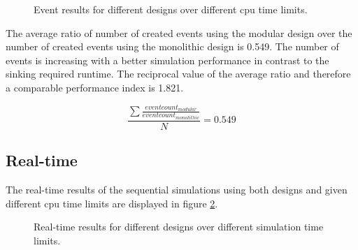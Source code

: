 \begin{figure}
    \centering
    \caption{Event results for different designs over different cpu time limits.}
    \label{fig:results_event_cpu_time}
\end{figure}

The average ratio of number of created events using the modular design over the number of created events using the monolithic design is 0.549.
The number of events is increasing with a better simulation performance in contrast to the sinking required runtime.
The reciprocal value of the average ratio and therefore a comparable performance index is 1.821.

\[\frac{\sum\frac{eventcount_{modular}}{eventcount_{monolithic}}}{N} = 0.549\]

\subsection{Real-time}
\label{sec:measurements_sequential_realtime}

The real-time results of the sequential simulations using both designs and given different cpu time limits are displayed in figure \ref{fig:results_realtime_sim_time}.

\begin{figure}
    \centering
    \caption{Real-time results for different designs over different simulation time limits.}
    \label{fig:results_realtime_sim_time}
\end{figure}

